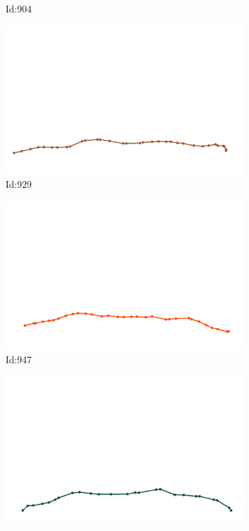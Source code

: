\documentclass[12pt,twoside]{report}
\begin{document}
\begin{figure}
\begin{subfigure}[b]{0.20\textwidth}
\caption{Id:904}
\end{subfigure}
\begin{subfigure}[b]{0.20\textwidth}
\centering
\includegraphics[width=\textwidth]{../../trajectories/929.png}
\caption{Id:929}
\end{subfigure}
\begin{subfigure}[b]{0.20\textwidth}
\centering
\includegraphics[width=\textwidth]{../../trajectories/947.png}
\caption{Id:947}
\end{subfigure}
\begin{subfigure}[b]{0.20\textwidth}
\centering
\includegraphics[width=\textwidth]{../../trajectories/951.png}

\end{subfigure}
\end{figure}
\end{document}
